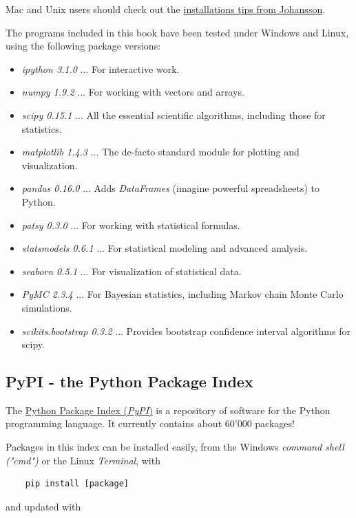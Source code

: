 Mac and Unix users should check out the \href{https://github.com/jrjohansson/scientific-python-lectures}{installations tips from Johansson}.

The programs included in this book have been tested under Windows and Linux, using the following package versions:

\begin{itemize}
  \item \emph{ipython 3.1.0} ... For interactive work.
  \item \emph{numpy 1.9.2} ... For working with vectors and arrays.
  \item \emph{scipy 0.15.1} ... All the essential scientific algorithms, including those for statistics.
  \item \emph{matplotlib 1.4.3} ... The de-facto standard module for plotting and visualization.
  \item \emph{pandas 0.16.0} ... Adds \emph{DataFrames} (imagine powerful spreadsheets) to Python.
  \item \emph{patsy 0.3.0} ... For working with statistical formulas.
  \item \emph{statsmodels 0.6.1} ... For statistical modeling and advanced analysis.
  \item \emph{seaborn 0.5.1} ... For visualization of statistical data.
  \item \emph{PyMC 2.3.4} ... For Bayesian statistics, including Markov chain Monte Carlo simulations.
  \item \emph{scikits.bootstrap 0.3.2} ... Provides bootstrap confidence interval algorithms for scipy.
\end{itemize}

\subsection{PyPI - the Python Package Index}

The \href{https://pypi.python.org/pypi}{Python Package Index (\emph{PyPI})} is a repository of software for the Python programming language. It currently contains about 60'000 packages!

Packages in this index can be installed easily, from the Windows \emph{command shell ("cmd")} or the Linux \emph{Terminal}, with

\begin{lstlisting}
    pip install [package]
\end{lstlisting}

and updated with

